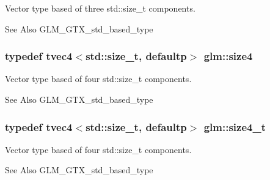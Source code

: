 Vector type based of three std\-::size\-\_\-t components. \begin{DoxySeeAlso}{See Also}
G\-L\-M\-\_\-\-G\-T\-X\-\_\-std\-\_\-based\-\_\-type 
\end{DoxySeeAlso}
\hypertarget{group__gtx__std__based__type_ga66a39603f01a37444de3adb28c021e79}{
\subsubsection[{size4}]{\setlength{\rightskip}{0pt plus 5cm}typedef tvec4$<$std\-::size\-\_\-t, defaultp$>$ {\bf glm\-::size4}}}\label{group__gtx__std__based__type_ga66a39603f01a37444de3adb28c021e79}
Vector type based of four std\-::size\-\_\-t components. \begin{DoxySeeAlso}{See Also}
G\-L\-M\-\_\-\-G\-T\-X\-\_\-std\-\_\-based\-\_\-type 
\end{DoxySeeAlso}
\hypertarget{group__gtx__std__based__type_gaa4f69cfac1c3e014a50fd090974092ec}{
\subsubsection[{size4\-\_\-t}]{\setlength{\rightskip}{0pt plus 5cm}typedef tvec4$<$std\-::size\-\_\-t, defaultp$>$ {\bf glm\-::size4\-\_\-t}}}\label{group__gtx__std__based__type_gaa4f69cfac1c3e014a50fd090974092ec}
Vector type based of four std\-::size\-\_\-t components. \begin{DoxySeeAlso}{See Also}
G\-L\-M\-\_\-\-G\-T\-X\-\_\-std\-\_\-based\-\_\-type 
\end{DoxySeeAlso}
